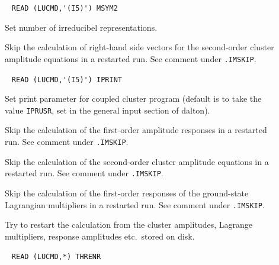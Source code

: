 \begin{description}
\item[] \verb| |\newline
       \verb|READ (LUCMD,'(I5)') MSYM2|

       Set number of irreducibel representations. 
 
\item[] 
   Skip the calculation of right-hand side vectors for the 
   second-order cluster amplitude equations
   in a restarted run. See comment under \verb|.IMSKIP|.
%
%

%
%
\item[]  \verb| |\newline
\verb|READ (LUCMD,'(I5)') IPRINT|

       Set print parameter for coupled cluster program
       (default is to take the value \verb+IPRUSR+, set in the general
       input section of dalton).
%
\item[] 
   Skip the calculation of the first-order amplitude responses
   in a restarted run. See comment under \verb|.IMSKIP|.
%
\item[] 
   Skip the calculation of the 
   second-order cluster amplitude equations
   in a restarted run. See comment under \verb|.IMSKIP|.
%
\item[] 
   Skip the calculation of the first-order responses of the 
   ground-state Lagrangian multipliers in a restarted run. See comment under \verb|.IMSKIP|.
%
\item[] 
       Try to restart the calculation from the cluster amplitudes,
       Lagrange multipliers, response amplitudes etc.\ stored on
       disk.
%
\item[] \verb| |\newline
       \verb|READ (LUCMD,*) THRENR|


\end{description}

